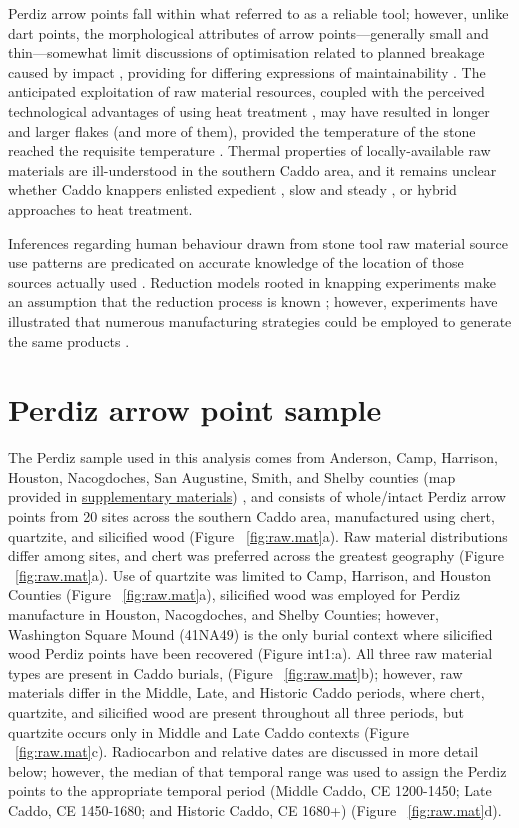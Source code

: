 \documentclass[review]{elsarticle}
\begin{document}
Perdiz arrow points fall within what \citet[738-741]{RN5873} referred to as a reliable tool; however, unlike dart points, the morphological attributes of arrow points—generally small and thin—somewhat limit discussions of optimisation related to planned breakage caused by impact \citep{RN6170,RN7045}, providing for differing expressions of maintainability \citep{RN5789}. The anticipated exploitation of raw material resources, coupled with the perceived technological advantages of using heat treatment \citep{RN6171}, may have resulted in longer and larger flakes (and more of them), provided the temperature of the stone reached the requisite temperature \citep{RN5900}. Thermal properties of locally-available raw materials are ill-understood in the southern Caddo area, and it remains unclear whether Caddo knappers enlisted expedient \citep{RN8970,RN6201}, slow and steady \citep{RN8971}, or hybrid approaches to heat treatment.

Inferences regarding human behaviour drawn from stone tool raw material source use patterns are predicated on accurate knowledge of the location of those sources actually used \citep[365]{RN5787}. Reduction models rooted in knapping experiments make an assumption that the reduction process is known \citep{RN6855}; however, experiments have illustrated that numerous manufacturing strategies could be employed to generate the same products \citep{RN8968,RN8969}. 

\section*{Perdiz arrow point sample}

The Perdiz sample used in this analysis comes from Anderson, Camp, Harrison, Houston, Nacogdoches, San Augustine, Smith, and Shelby counties (map provided in \href{https://aksel-blaise.github.io/perdiz/spatial.html}{supplementary materials}) \citep{RN8980}, and consists of whole/intact Perdiz arrow points from 20 sites across the southern Caddo area, manufactured using chert, quartzite, and silicified wood (Figure ~\ref{fig:raw.mat}a). Raw material distributions differ among sites, and chert was preferred across the greatest geography (Figure ~\ref{fig:raw.mat}a). Use of quartzite was limited to Camp, Harrison, and Houston Counties (Figure ~\ref{fig:raw.mat}a), silicified wood was employed for Perdiz manufacture in Houston, Nacogdoches, and Shelby Counties; however, Washington Square Mound (41NA49) is the only burial context where silicified wood Perdiz points have been recovered (Figure int1:a). All three raw material types are present in Caddo burials, (Figure ~\ref{fig:raw.mat}b); however, raw materials differ in the Middle, Late, and Historic Caddo periods, where chert, quartzite, and silicified wood are present throughout all three periods, but quartzite occurs only in Middle and Late Caddo contexts (Figure ~\ref{fig:raw.mat}c). Radiocarbon and relative dates are discussed in more detail below; however, the median of that temporal range was used to assign the Perdiz points to the appropriate temporal period (Middle Caddo, CE 1200-1450; Late Caddo, CE 1450-1680; and Historic Caddo, CE 1680+) (Figure ~\ref{fig:raw.mat}d).
\end{document}
